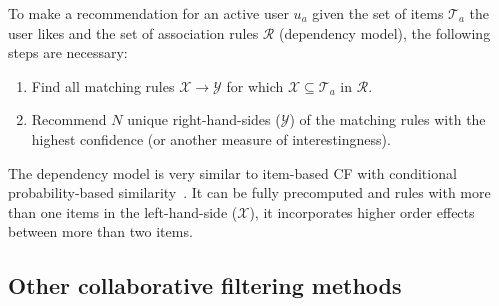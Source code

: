 \documentclass[nojss]{jss}
\newcommand{\set}[1]{\mathcal{#1}}
\begin{document}
To make a recommendation for an active user $u_a$ given the
set of items $\set{T}_a$ the user likes and the
set of association rules $\set{R}$ (dependency model),
the following steps are necessary:
\begin{enumerate}
\item Find all matching rules $\set{X} \rightarrow \set{Y}$ for 
which $\set{X} \subseteq \set{T}_a$ 
in $\set{R}$.
\item Recommend $N$ unique right-hand-sides ($\set{Y}$) of the matching rules 
with the highest confidence (or another measure of interestingness).
\end{enumerate}

The dependency model is very similar to
item-based CF with conditional probability-based 
similarity~\citep{recommender:Deshpande:2004}. It can be fully precomputed
and rules with more than one items in the left-hand-side ($\set{X}$), 
it incorporates higher order effects between more than two items. 

\subsection{Other collaborative filtering methods}
\end{document}
